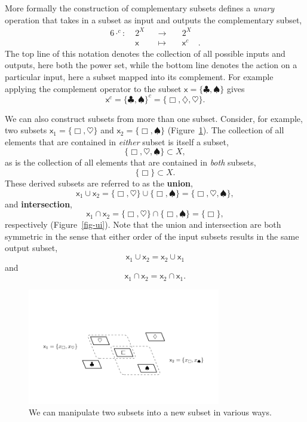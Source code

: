 \documentclass[
  letterpaper,
  DIV=11,
  numbers=noendperiod]{scrartcl}
\begin{document}
More formally the construction of complementary subsets defines a
\emph{unary} operation that takes in a subset as input and outputs the
complementary subset, \begin{alignat*}{6}
\cdot^c :\; & 2^X & &\rightarrow& \; & 2^X &
\\
& \mathsf{x} & &\mapsto& & \mathsf{x}^{c} &.
\end{alignat*} The top line of this notation denotes the collection of
all possible inputs and outputs, here both the power set, while the
bottom line denotes the action on a particular input, here a subset
mapped into its complement. For example applying the complement operator
to the subset \(\mathsf{x} = \{ \clubsuit, \spadesuit \}\) gives \[
\mathsf{x}^{c}
= \{ \clubsuit, \spadesuit \}^{c}
= \{ \Box, \diamondsuit, \heartsuit \}.
\]

We can also construct subsets from more than one subset. Consider, for
example, two subsets \(\mathsf{x}_1 = \{ \Box, \heartsuit \}\) and
\(\mathsf{x}_2 = \{ \Box, \spadesuit \}\) (Figure~\ref{fig-subsets}).
The collection of all elements that are contained in \emph{either}
subset is itself a subset, \[
\{ \Box, \heartsuit, \spadesuit \} \subset X,
\] as is the collection of all elements that are contained in
\emph{both} subsets, \[
\{ \Box \} \subset X.
\] These derived subsets are referred to as the \textbf{union}, \[
\mathsf{x}_1 \cup \mathsf{x}_2
= \{ \Box, \heartsuit \} \cup \{ \Box, \spadesuit \}
= \{ \Box, \heartsuit, \spadesuit \},
\] and \textbf{intersection}, \[
\mathsf{x}_1 \cap \mathsf{x}_2
= \{ \Box, \heartsuit \} \cap \{ \Box, \spadesuit \}
= \{ \Box \},
\] respectively (Figure~\ref{fig-ui}). Note that the union and
intersection are both symmetric in the sense that either order of the
input subsets results in the same output subset, \[
\mathsf{x}_1 \cup \mathsf{x}_2 = \mathsf{x}_2 \cup \mathsf{x}_1
\] and \[
\mathsf{x}_1 \cap \mathsf{x}_2 = \mathsf{x}_2 \cap \mathsf{x}_1.
\]

\begin{figure}

{\centering \includegraphics[width=0.75\textwidth,height=\textheight]{figures/overlapping_subsets/overlapping_subsets.pdf}

}

\caption{\label{fig-subsets}We can manipulate two subsets into a new
subset in various ways.}

\end{figure}
\end{document}
